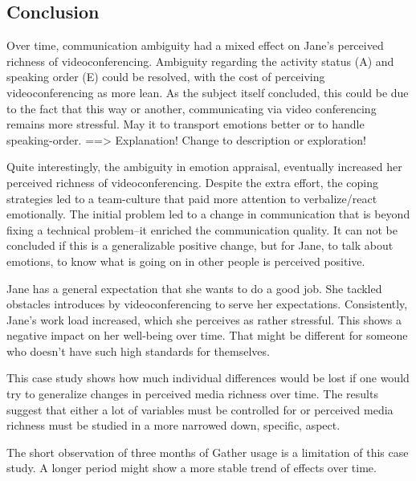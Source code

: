 \documentclass[man]{apa7}
\begin{document}
\subsection{Conclusion}

Over time, communication ambiguity had a mixed effect on Jane's perceived richness of videoconferencing. Ambiguity regarding the activity status (A) and speaking order (E) could be resolved, with the cost of perceiving videoconferencing as more lean. As the subject itself concluded, this could be due to the fact that this way or another, communicating via video conferencing remains more stressful. May it to transport emotions better or to handle speaking-order. ==> Explanation! Change to description or exploration!

Quite interestingly, the ambiguity in emotion appraisal, eventually increased her perceived richness of videoconferencing. Despite the extra effort, the coping strategies led to a team-culture that paid more attention to verbalize/react emotionally. The initial problem led to a change in communication that is beyond fixing a technical problem–it enriched the communication quality. It can not be concluded if this is a generalizable positive change, but for Jane, to talk about emotions, to know what is going on in other people is perceived positive.

Jane has a general expectation that she wants to do a good job. She tackled obstacles introduces by videoconferencing to serve her expectations. Consistently, Jane's work load increased, which she perceives as rather stressful. This shows a negative impact on her well-being over time. That might be different for someone who doesn't have such high standards for themselves.

This case study shows how much individual differences would be lost if one would try to generalize changes in perceived media richness over time. The results suggest that either a lot of variables must be controlled for or perceived media richness must be studied in a more narrowed down, specific, aspect.

The short observation of three months of Gather usage is a limitation of this case study. A longer period might show a more stable trend of effects over time.

\printbibliography

\appendix
\end{document}
